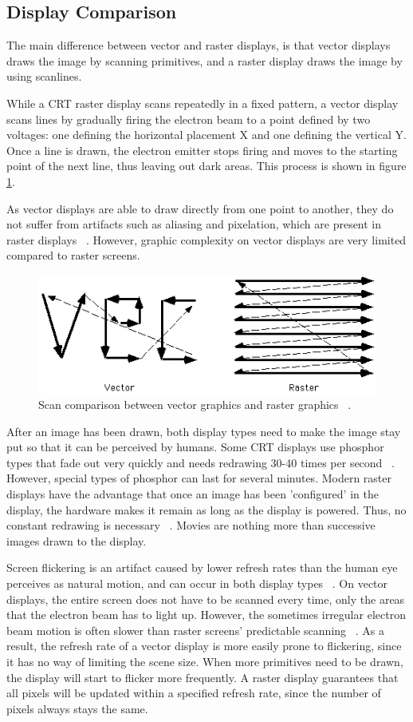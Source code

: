 \subsection{Display Comparison}
The main difference between vector and raster displays, is that vector displays draws the image by scanning primitives, and a raster display draws the image by using scanlines.

While a CRT raster display scans repeatedly in a fixed pattern, a vector display scans lines by gradually firing the electron beam to a point defined by two voltages: one defining the horizontal placement X and one defining the vertical Y.
Once a line is drawn, the electron emitter stops firing and moves to the starting point of the next line, thus leaving out dark areas.
This process is shown in figure \ref{fig:vectorscan}.

As vector displays are able to draw directly from one point to another, they do not suffer from artifacts such as aliasing and pixelation, which are present in raster displays ~\cite{vector-monitor}.
However, graphic complexity on vector displays are very limited compared to raster screens.

\begin{figure}[h!]
\centering \includegraphics[width=0.8\linewidth]{images/scan.png}
\caption{Scan comparison between vector graphics and raster graphics ~\cite{vecvsras}.}
\label{fig:vectorscan}
\end{figure}

After an image has been drawn, both display types need to make the image stay put so that it can be perceived by humans.
Some CRT displays use phosphor types that fade out very quickly and needs redrawing 30-40 times per second ~\cite{vector-monitor}.
However, special types of phosphor can last for several minutes.
Modern raster displays have the advantage that once an image has been 'configured' in the display, the hardware makes it remain as long as the display is powered.
Thus, no constant redrawing is necessary ~\cite{LCD-persistence}.
Movies are nothing more than successive images drawn to the display.

Screen flickering is an artifact caused by lower refresh rates than the human eye perceives as natural motion, and can occur in both display types ~\cite{flicker}.
On vector displays, the entire screen does not have to be scanned every time, only the areas that the electron beam has to light up.
However, the sometimes irregular electron beam motion is often slower than raster screens' predictable scanning ~\cite{vecvsras}.
As a result, the refresh rate of a vector display is more easily prone to flickering, since it has no way of limiting the scene size.
When more primitives need to be drawn, the display will start to flicker more frequently.
A raster display guarantees that all pixels will be updated within a specified refresh rate, since the number of pixels always stays the same.
